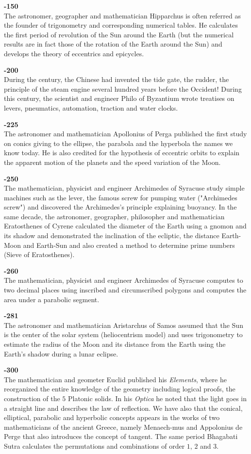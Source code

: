 \textbf{-150}\\
The astronomer, geographer and mathematician Hipparchus is often referred as the founder of trigonometry and corresponding numerical tables. He calculates the first period of revolution of the Sun around the Earth (but the numerical results are in fact those of the rotation of the Earth around the Sun) and develops the theory of eccentrics and epicycles.

\textbf{-200}\\
During the century, the Chinese had invented the tide gate, the rudder, the principle of the steam engine several hundred years before the Occident! During this century, the scientist and engineer Philo of Byzantium wrote treatises on levers, pneumatics, automation, traction and water clocks.

\textbf{-225}\\
The astronomer and mathematician Apollonius of Perga published the first study on conics giving to the ellipse, the parabola and the hyperbola the names we know today. He is also credited for the hypothesis of eccentric orbits to explain the apparent motion of the planets and the speed variation of the Moon.

\textbf{-250}\\
The mathematician, physicist and engineer Archimedes of Syracuse study simple machines such as the lever, the famous screw for pumping water ("Archimedes screw") and discovered the Archimedes's principle explaining buoyancy. In the same decade, the astronomer, geographer, philosopher and mathematician Eratosthenes of Cyrene calculated the diameter of the Earth using a gnomon and its shadow and demonstrated the inclination of the ecliptic, the distance Earth-Moon and Earth-Sun and also created a method to determine prime numbers (Sieve of Eratosthenes).

\textbf{-260}\\
The mathematician, physicist and engineer Archimedes of Syracuse computes to two decimal places using inscribed and circumscribed polygons and computes the area under a parabolic segment.

\textbf{-281}\\
The astronomer and mathematician Aristarchus of Samos assumed that the Sun is the center of the solar system (heliocentrism model) and uses trigonometry to estimate the radius of the Moon and its distance from the Earth using the Earth's shadow during a lunar eclipse.

\textbf{-300}\\
The mathematician and geometer Euclid published his \textit{Elements}, where he reorganized the entire knowledge of the geometry including logical proofs, the construction of the $5$ Platonic solids. In his \textit{Optica} he noted that the light goes in a straight line and describes the law of reflection. We have also that the conical, elliptical, parabolic and hyperbolic concepts appears in the works of two mathematicians of the ancient Greece, namely Menaech-mus and Appolonius de Perge that also introduces the concept of tangent. The same period Bhagabati Sutra calculates the permutations and combinations of order $1$, $2$ and $3$.

